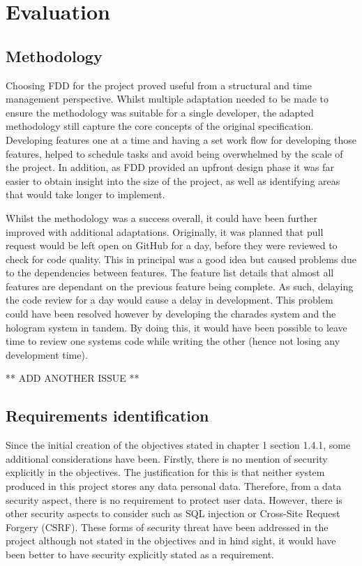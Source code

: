 \chapter{Evaluation}

\section{Methodology}
Choosing FDD for the project proved useful from a structural and time management perspective. Whilst multiple adaptation needed to be made to ensure the methodology was suitable for a single  developer, the adapted methodology still capture the core concepts of the original specification. Developing features one at a time and having a set work flow for developing those features, helped to schedule tasks and avoid being overwhelmed by the scale of the project. In addition, as FDD provided an upfront design phase it was far easier to obtain insight into the size of the project, as well as identifying areas that would take longer to implement.

Whilst the methodology was a success overall, it could have been further improved with additional adaptations. Originally, it was planned that pull request would be left open on GitHub for a day, before they were reviewed to check for code quality. This in principal was a good idea but caused problems due to the dependencies between features. The feature list details that almost all features are dependant on the previous feature being complete. As such, delaying the code review for a day would cause a delay in development. This problem could have been resolved however by developing the charades system and the hologram system in tandem. By doing this, it would have been possible to leave time to review one systems code while writing the other (hence not losing any development time).

** ADD ANOTHER ISSUE **

\section{Requirements identification}

Since the initial creation of the objectives stated in chapter 1 section 1.4.1, some additional considerations have been. Firstly, there is no mention of security explicitly in the objectives. The justification for this is that neither system produced in this project stores any data personal data. Therefore, from a data security aspect, there is no requirement to protect user data. However, there is other security aspects to consider such as SQL injection or Cross-Site Request Forgery (CSRF). These forms of security threat have been addressed in the project although not stated in the objectives and in hind sight, it would have been better to have security explicitly stated as a requirement.

